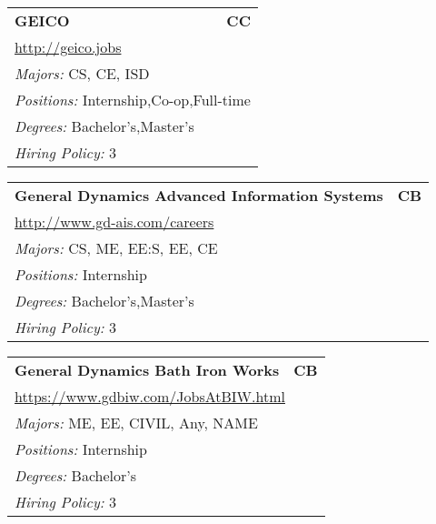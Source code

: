 \documentclass[twoside]{article}
\begin{document}
\begin{center}
\begin{multicols}{3}
\begin{FlushLeft}
\begin{minipage}{\columnwidth}
\end{minipage}
 
\begin{minipage}{\columnwidth}\begin{tabularx}{.95\columnwidth}{Xr}
                 {\Large\bf GEICO} & {\Large\bf CC}\\
    \multicolumn{2}{p{.95\columnwidth}}{\url{http://geico.jobs}}\\
    \multicolumn{2}{p{.95\columnwidth}}{\emph{Majors:} CS, CE, ISD}\\
    \multicolumn{2}{p{.95\columnwidth}}{\emph{Positions:} Internship,Co-op,Full-time}\\
    \multicolumn{2}{p{.95\columnwidth}}{\emph{Degrees:} Bachelor's,Master's}\\
    \multicolumn{2}{p{.95\columnwidth}}{\emph{Hiring Policy:} 3}\\
    \end{tabularx}
    
\end{minipage}
 
\begin{minipage}{\columnwidth}\begin{tabularx}{.95\columnwidth}{Xr}
                 {\Large\bf General Dynamics Advanced Information Systems} & {\Large\bf CB}\\
    \multicolumn{2}{p{.95\columnwidth}}{\url{http://www.gd-ais.com/careers}}\\
    \multicolumn{2}{p{.95\columnwidth}}{\emph{Majors:} CS, ME, EE:S, EE, CE}\\
    \multicolumn{2}{p{.95\columnwidth}}{\emph{Positions:} Internship}\\
    \multicolumn{2}{p{.95\columnwidth}}{\emph{Degrees:} Bachelor's,Master's}\\
    \multicolumn{2}{p{.95\columnwidth}}{\emph{Hiring Policy:} 3}\\
    \end{tabularx}
    
\end{minipage}
 
\begin{minipage}{\columnwidth}\begin{tabularx}{.95\columnwidth}{Xr}
                 {\Large\bf General Dynamics Bath Iron Works} & {\Large\bf CB}\\
    \multicolumn{2}{p{.95\columnwidth}}{\url{https://www.gdbiw.com/JobsAtBIW.html}}\\
    \multicolumn{2}{p{.95\columnwidth}}{\emph{Majors:} ME, EE, CIVIL, Any, NAME}\\
    \multicolumn{2}{p{.95\columnwidth}}{\emph{Positions:} Internship}\\
    \multicolumn{2}{p{.95\columnwidth}}{\emph{Degrees:} Bachelor's}\\
    \multicolumn{2}{p{.95\columnwidth}}{\emph{Hiring Policy:} 3}\\
    \end{tabularx}
    

\end{minipage}
\end{FlushLeft}
\end{multicols}
\end{center}
\end{document}
